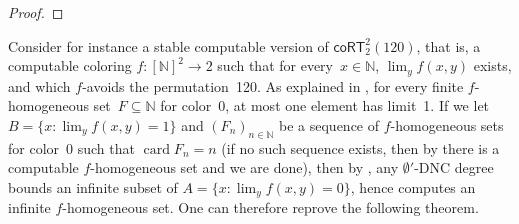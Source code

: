 \documentclass{article}
\numberwithin{theorem}{section}
\newcommand{\dbf}{\mathbf{d}}
\newcommand{\uh}{\upharpoonright}
\newcommand{\coRT}[0]{\mathsf{coRT}}
\newcommand{\NN}[0]{\mathbb{N}}
\newcommand{\card}{\operatorname{card}}
\begin{document}
\begin{proof}

\end{proof}

Consider for instance a stable computable version of $\coRT^2_2(120)$, that is, a computable coloring $f : [\NN]^2 \to 2$ such that for every~$x \in \NN$, $\lim_y f(x, y)$ exists, and which $f$-avoids the permutation~120. As explained in , for every finite $f$-homogeneous set~$F \subseteq \NN$ for color~0, at most one element has limit~1. If we let $B = \{ x : \lim_y f(x, y) = 1 \}$ and $(F_n)_{n \in \NN}$ be a sequence of $f$-homogeneous sets for color~0 such that $\card F_n = n$ (if no such sequence exists, then by  there is a computable $f$-homogeneous set and we are done), then by , any $\emptyset'$-DNC degree bounds an infinite subset of $A = \{ x : \lim_y f(x, y) = 0 \}$, hence computes an infinite $f$-homogeneous set. One can therefore reprove the following theorem.
\end{document}
